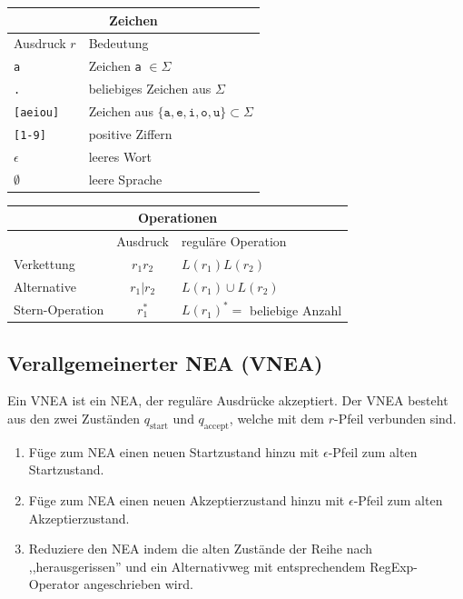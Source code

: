 \documentclass[a4paper]{article}
\begin{document}
	\begin{multicols}{2}
	\begin{tabular}{|l|l|}
		\multicolumn{2}{c}{\textbf{Zeichen}} \\
		\hline
		Ausdruck $r$     & Bedeutung \\\hline
		\texttt{a}       & Zeichen \texttt{a} $\in \Sigma$ \\
		\texttt{.}       & beliebiges Zeichen aus $\Sigma$ \\
		\texttt{[aeiou]} & Zeichen aus $\{ \texttt{a},\texttt{e},\texttt{i},\texttt{o},\texttt{u} \} \subset \Sigma$ \\
		\texttt{[1-9]}   & positive Ziffern \\
		$\epsilon$       & leeres Wort \\
		$\emptyset$      & leere Sprache \\\hline
	\end{tabular}
	
	\begin{tabular}{|l|c|l|}
		\multicolumn{3}{c}{\textbf{Operationen}} \\\hline
		                & Ausdruck  & reguläre Operation \\\hline
		Verkettung      & $r_1r_2$  & $L(r_1)L(r_2)$ \\
		Alternative     & $r_1|r_2$ & $L(r_1) \cup L(r_2)$ \\
		Stern-Operation & $r_1^*$   & $L(r_1)^* =$ beliebige Anzahl \\\hline
	\end{tabular}
	\end{multicols}
	
\subsection{Verallgemeinerter NEA (VNEA)}
	Ein VNEA ist ein NEA, der reguläre Ausdrücke akzeptiert. Der VNEA besteht aus den zwei Zuständen $q_{\text{start}}$ und $q_{\text{accept}}$, welche mit dem $r$-Pfeil verbunden sind.	
	\begin{falgo}
		\begin{enumerate}
			\item Füge zum NEA einen neuen Startzustand hinzu mit $\epsilon$-Pfeil zum alten Startzustand.
			\item Füge zum NEA einen neuen Akzeptierzustand hinzu mit $\epsilon$-Pfeil zum alten Akzeptierzustand.
			\item Reduziere den NEA indem die alten Zustände der Reihe nach ,,herausgerissen'' und ein Alternativweg mit entsprechendem RegExp-Operator angeschrieben wird.
		\end{enumerate}
	\end{falgo}
	
\end{document}
